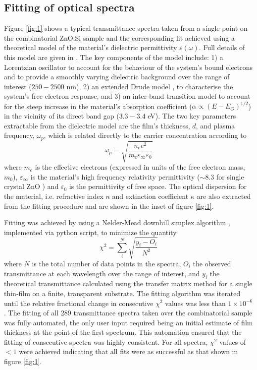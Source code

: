 \documentclass[preprint]{elsarticle}
\begin{document}
\subsection{Fitting of optical spectra}\label{sec:2.1}

Figure \ref{fig:1} shows a typical transmittance spectra taken from a single point on the combinatorial ZnO:Si sample and the corresponding fit achieved using a theoretical model of the material's dielectric permittivity $\varepsilon(\omega)$. Full details of this model are given in \cite{Treharne2012}. The key components of the model include: 1) a Lorentzian oscillator to account for the behaviour of the system's bound electrons and to provide a smoothly varying dielectric background over the range of interest ($250-2500$ nm), 2) an extended Drude model \cite{Mergel2002}, to characterise the system's free electron response, and 3) an inter-band transition model to account for the steep increase in the material's absorption coefficient ($\alpha \propto (E-E_G)^{1/2}$) in the vicinity of its direct band gap ($3.3 - 3.4$ eV). The two key parameters extractable from the dielectric model are the film's thickness, $d$, and plasma frequency, $\omega_{p}$, which is related directly to the carrier concentration according to
\begin{equation}
\label{eqn:1}
\omega_p = \sqrt{\frac{n_e e^2}{m_e\varepsilon_{\infty} \varepsilon_0}}
\end{equation}
where $m_e$ is the effective electrons (expressed in units of the free electron mass, $m_0$), $\varepsilon_{\infty}$ is the material's high frequency relativity permittivity  ($\sim 8.3$ for single crystal ZnO \citep{Ashkenov2003}) and $\varepsilon_0$ is the permittivity of free space. The optical dispersion for the material, i.e. refractive index $n$ and extinction coefficient $\kappa$ are also extracted from the fitting procedure and are shown in the inset of figure \ref{fig:1}.

Fitting was achieved by using a Nelder-Mead downhill simplex algorithm \cite{Nelder1965}, implemented via python script, to minimize the quantity
\begin{equation}
\chi^{2} = \sum_{i}^N\sqrt{\frac{y_i - O_i}{N^2}}
\end{equation}\label{eqn:2}
where $N$ is the total number of data points in the spectra, $O_i$ the observed transmittance at each wavelength over the range of interest, and $y_i$ the theoretical transmittance calculated using the transfer matrix method \cite{Macleod1986} for a single thin-film on a finite, transparent substrate.  The fitting algorithm was iterated until the relative fractional change in consecutive $\chi^2$ values was less than $1\times10^{-6}$. The fitting of all 289 transmittance spectra taken over the combinatorial sample was fully automated, the only user input required being an initial estimate of film thickness at the point of the first spectrum. This automation ensured that the fitting of consecutive spectra was highly consistent. For all spectra, $\chi^2$ values of $<1$ were achieved indicating that all fits were as successful as that shown in figure \ref{fig:1}.
\end{document}

